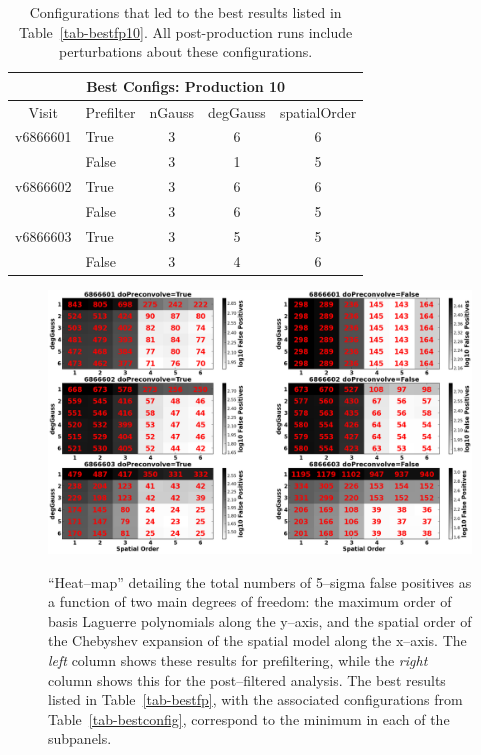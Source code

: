 \documentclass[prd, nofootinbib, floatfix, 11pt,tightenlines,times]{article}
\begin{document}
\begin{table}
\centering
\begin{tabular}{clccc}
\hline
\multicolumn{5}{|c|}{Best Configs: Production 10} \\
\hline
Visit    & Prefilter & nGauss & degGauss & spatialOrder \\
\hline
v6866601 & True      & 3      & 6        & 6 \\
         & False     & 3      & 1        & 5 \\
v6866602 & True      & 3      & 6        & 6 \\
         & False     & 3      & 6        & 5 \\
v6866603 & True      & 3      & 5        & 5 \\
         & False     & 3      & 4        & 6 \\
\end{tabular}
\caption{Configurations that led to the best results listed in
  Table~\ref{tab-bestfp10}.  All post-production runs include
  perturbations about these configurations. \label{tab-bestconfig10}}
\end{table}


\clearpage

\begin{figure}
\includegraphics[width=1.0\textwidth]{figures/heatmap10.eps} \\
\caption{``Heat--map'' detailing the total numbers of 5--sigma false
  positives as a function of two main degrees of freedom: the maximum
  order of basis Laguerre polynomials along the y--axis, and the
  spatial order of the Chebyshev expansion of the spatial model along
  the x--axis.  The {\it left} column shows these results for
  prefiltering, while the {\it right} column shows this for the
  post--filtered analysis.  The best results listed in
  Table~\ref{tab-bestfp}, with the associated configurations from
  Table~\ref{tab-bestconfig}, correspond to the minimum in each of the
  subpanels.  }
\label{fp_heatmap}
\end{figure}
\end{document}
